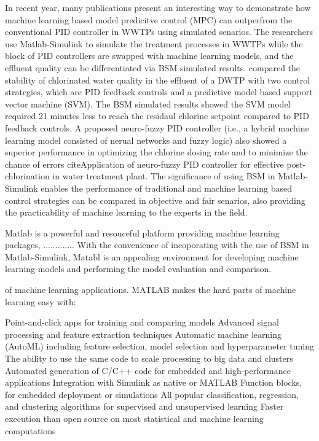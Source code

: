 In recent year, many publications present an interesting way to demonstrate how machine learning based model predicitve control (MPC) can outperfrom the conventional PID controller in WWTPs using simulated senarios. The researchers use Matlab-Simulink to simulate the treatment processes in WWTPs while the block of PID controllers are swapped with machine learning models, and the effluent quality can be differentiated via BSM simulated results. \citet{wangModelPredictiveControl2020} compared the stability of chlorinated water quality in the effluent of a DWTP with two control strategies, which are PID feedback controls and a predictive model based support vector machine (SVM). The BSM simulated results showed the SVM model required 21 minutes less to reach the residaul chlorine setpoint compared to PID feedback controls. A proposed neuro-fuzzy PID controller (i.e., a hybrid machine learning model consisted of nerual networks and fuzzy logic) also showed a superior performance in optimizing the chlorine dosing rate and to minimize the chance of errors citeApplication of neuro-fuzzy PID controller for effective post-chlorination in water treatment plant. The significance of using BSM in Matlab-Simulink enables the performance of traditional and machine learning based control strategies can be compared in objective and fair senarios, also providing the practicability of machine learning to the experts in the field. 

Matlab is a powerful and resouceful platform providing machine learning packages, ............. With the convenience of incoporating with the use of BSM in Matlab-Simulink, Matabl is an appealing environment for developing machine learning models and performing the model evaluation and comparison. 

of machine learning applications. MATLAB makes the hard parts of machine learning easy with:

Point-and-click apps for training and comparing models
Advanced signal processing and feature extraction techniques
Automatic machine learning (AutoML) including feature selection, model selection and hyperparameter tuning
The ability to use the same code to scale processing to big data and clusters
Automated generation of C/C++ code for embedded and high-performance applications
Integration with Simulink as native or MATLAB Function blocks, for embedded deployment or simulations
All popular classification, regression, and clustering algorithms for supervised and unsupervised learning
Faster execution than open source on most statistical and machine learning computations


